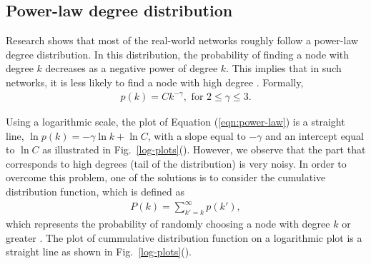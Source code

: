\documentclass[10pt,a4paper]{article}
\begin{document}
\subsection{Power-law degree distribution}
Research shows that most of the real-world networks roughly follow a power-law degree distribution. In this distribution, the probability of finding a node with degree $k$ decreases as a negative power of degree $k$. This implies that in such networks, it is less likely to find a node with high degree \citep{estrada2011structure}.
Formally,
\begin{eqnarray}
p(k) = C k^{-\gamma}, \text{ for } 2 \leq  \gamma \leq  3.
\label{eqn:power-law}
\end{eqnarray}

Using a logarithmic scale, the plot of Equation (\ref{eqn:power-law}) is a straight line, $\ln p(k) = -\gamma \ln k + \ln C $, with a slope equal to $-\gamma $ and an intercept equal to $\ln C$ as illustrated in Fig.~\ref{log-plots}(). However, we observe that the part that corresponds to high degrees (tail of the distribution) is very noisy. In order to overcome this problem, one of the solutions is to consider the cumulative distribution function, which is defined as 
\begin{eqnarray*}
	P(k) = \sum_{k'=k}^\infty p(k'),
\end{eqnarray*}
which represents the probability of randomly choosing a node with degree $k$ or greater \citep{estrada2011structure}. The plot of cummulative distribution function on a logarithmic plot is a straight line as shown in Fig.~\ref{log-plots}().
\end{document}
